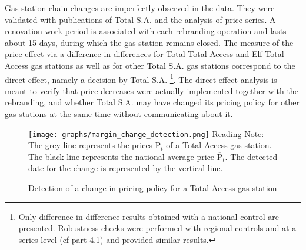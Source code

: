 \documentclass[english]{article}
\begin{document}
Gas station chain changes are imperfectly observed in the data. They were validated with publications of Total S.A. and the analysis of price series. A renovation work period is associated with each rebranding operation and lasts about 15 days, during which the gas station remains closed. The measure of the price effect via a difference in differences for Total-Total Access and Elf-Total Access gas stations as well as for other Total S.A. gas stations correspond to the direct effect, namely a decision by Total S.A.%
\footnote{Only difference in difference results obtained with a national control are presented. Robustness checks were performed with regional controls and at a series level (cf part 4.1) and provided similar results.%
}. The direct effect analysis is meant to verify that price decreases were actually implemented together with the rebranding, and whether Total S.A. may have changed its pricing policy for other gas stations at the same time without communicating about it.

\begin{figure}[htb!]
    \caption{Detection of a change in pricing policy for a Total Access gas station}
		\label{fig:margin_change_detection}
\texttt{[image: graphs/margin\_change\_detection.png]}
\flushleft
{\footnotesize\uline{Reading Note}: The grey line represents the prices $\mathrm{P}_{t}$ of a Total Access gas station. The black line represents the national average price $\overline{\mathrm{P}}_{t}$. The detected date for the change is represented by the vertical line.}
\end{figure}
\end{document}
